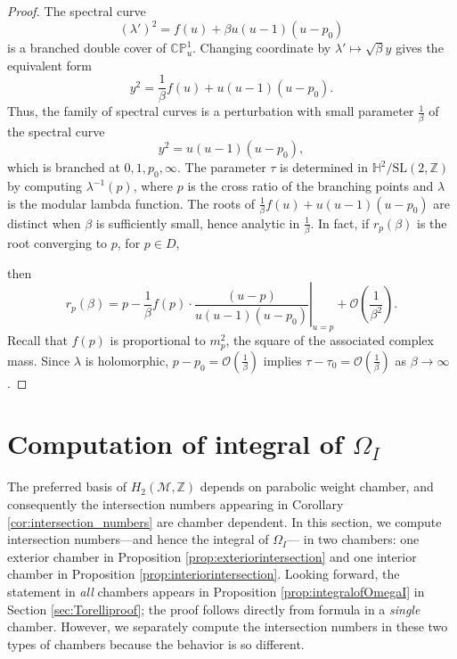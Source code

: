 \documentclass[12pt,letterpaper,reqno]{amsart}
\theoremstyle{remark}
\theoremstyle{definition}
\numberwithin{thm}{section}
\numberwithin{equation}{section}
\numberwithin{figure}{section}
\newcommand{\cM}{\ensuremath{\mathcal M}}
\newcommand{\CP}{\ensuremath{\mathbb {CP}}}
\newcommand{\Z}{\ensuremath{\mathbb Z}}
\begin{document}
\begin{proof}The spectral curve 
\[
(\lambda')^2 = f(u) + \beta u (u-1)(u-p_0)
\]
is a branched double cover of $\CP^1_u$.  Changing coordinate by $\lambda' \mapsto \sqrt{\beta} y$ gives the equivalent form
\[ 
y^2 = \frac{1}{\beta} f(u) + u (u-1)(u-p_0).
\]
Thus, the family of spectral curves is a perturbation with small parameter $\frac{1}{\beta}$ of the spectral curve 
\[
y^2 =  u (u-1)(u-p_0),
\]
which is branched at $0, 1, p_0, \infty$.  
The parameter $\tau$ is determined in $\mathbb H^2/\mathrm{SL}(2,\Z)$ by computing $\lambda^{-1}(p)$, where $p$ is the cross ratio of the 
branching points and $\lambda$ is the modular lambda function.  The roots of $\frac{1}{\beta} f(u) + u (u-1)(u-p_0)$ are distinct when
$\beta$ is sufficiently small, hence analytic in $\frac{1}{\beta}$.  In fact, if $r_p(\beta)$ is the root converging to $p$, for $p \in D$,

then 
\[
r_p(\beta) = p - \frac{1}{\beta} f(p) \cdot \left.\frac{(u-p)}{u (u-1)(u-p_0)} \right|_{u=p} + \mathcal O\left(\frac{1}{\beta^2}\right).
\]
Recall that $f(p)$ is proportional to $m_p^2$, the square of the associated complex mass.
Since $\lambda$ is holomorphic, $p-p_0 = \mathcal O(\frac{1}{\beta})$ implies $\tau - \tau_0 = \mathcal O(\frac{1}{\beta})$ as $\beta \to \infty$.
\end{proof}


\section{Computation of integral of \texorpdfstring{$\Omega_I$}{the holomorphic symplectic form}}\label{sec:TorelliOmegaI}

The preferred basis of $H_2(\cM,\Z)$ depends on parabolic weight chamber, and consequently the intersection numbers
appearing in Corollary \ref{cor:intersection_numbers} are chamber dependent.
In this section, we compute intersection numbers---and hence the integral of $\Omega_I$--- in two chambers: one exterior chamber in Proposition \ref{prop:exteriorintersection} and one interior chamber in Proposition \ref{prop:interiorintersection}.  Looking forward, the statement in \emph{all} chambers appears in Proposition \ref{prop:integralofOmegaI} in Section \ref{sec:Torelliproof}; the proof 
follows directly from formula in a \emph{single} chamber. However, we separately compute the intersection numbers in these two types of chambers because the behavior is so different. 
\end{document}
